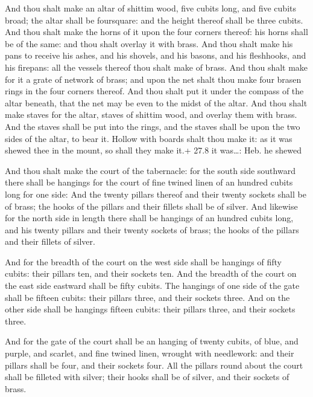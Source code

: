  And thou shalt make an altar of shittim wood, five cubits
long, and five cubits broad; the altar shall be foursquare: and the
height thereof shall be three cubits.  And thou shalt make
the horns of it upon the four corners thereof: his horns shall be of the
same: and thou shalt overlay it with brass.  And thou shalt
make his pans to receive his ashes, and his shovels, and his basons, and
his fleshhooks, and his firepans: all the vessels thereof thou shalt
make of brass.  And thou shalt make for it a grate of
network of brass; and upon the net shalt thou make four brasen rings in
the four corners thereof.  And thou shalt put it under the
compass of the altar beneath, that the net may be even to the midst of
the altar.  And thou shalt make staves for the altar, staves
of shittim wood, and overlay them with brass.  And the
staves shall be put into the rings, and the staves shall be upon the two
sides of the altar, to bear it.  Hollow with boards shalt
thou make it: as it was shewed thee in the mount, so shall they make
it.+ 27.8 it was\ldots: Heb. he shewed

 And thou shalt make the court of the tabernacle: for the
south side southward there shall be hangings for the court of fine
twined linen of an hundred cubits long for one side:  And
the twenty pillars thereof and their twenty sockets shall be of brass;
the hooks of the pillars and their fillets shall be of silver.
 And likewise for the north side in length there shall be
hangings of an hundred cubits long, and his twenty pillars and their
twenty sockets of brass; the hooks of the pillars and their fillets of
silver.

 And for the breadth of the court on the west side shall
be hangings of fifty cubits: their pillars ten, and their sockets ten.
 And the breadth of the court on the east side eastward
shall be fifty cubits.  The hangings of one side of the
gate shall be fifteen cubits: their pillars three, and their sockets
three.  And on the other side shall be hangings fifteen
cubits: their pillars three, and their sockets three.

 And for the gate of the court shall be an hanging of
twenty cubits, of blue, and purple, and scarlet, and fine twined linen,
wrought with needlework: and their pillars shall be four, and their
sockets four.  All the pillars round about the court shall
be filleted with silver; their hooks shall be of silver, and their
sockets of brass.

